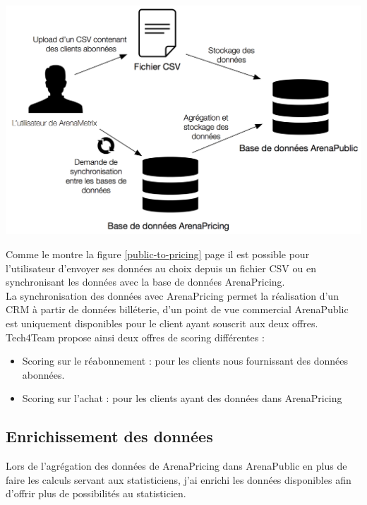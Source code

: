 \begin{center}
\includegraphics[scale=0.7]{images/public-to-pricing.png}
\label{public-to-pricing}
\end{center}

Comme le montre la figure \ref{public-to-pricing} page \pageref{public-to-pricing} il est possible pour l'utilisateur d'envoyer ses données au choix depuis un fichier CSV ou en synchronisant les données avec la base de données ArenaPricing. 
\\

La synchronisation des données avec ArenaPricing permet la réalisation d'un CRM à partir de données billéterie, d'un point de vue commercial ArenaPublic est uniquement disponibles pour le client ayant souscrit aux deux offres. 
\\

Tech4Team propose ainsi deux offres de scoring différentes : 

\begin{itemize}
  \item[\textbullet] Scoring sur le réabonnement : pour les clients nous fournissant des données abonnées. 
  \item[\textbullet] Scoring sur l'achat : pour les clients ayant des données dans ArenaPricing  
\end{itemize} 



\subsection{Enrichissement des données}
Lors de l'agrégation des données de ArenaPricing dans ArenaPublic en plus de faire les calculs servant aux statisticiens, j'ai enrichi les données disponibles afin d'offrir plus de possibilités au statisticien.
